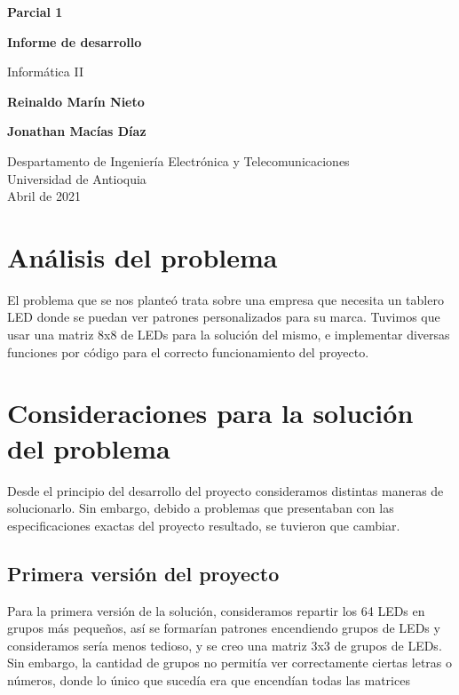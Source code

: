 \documentclass{article}
\begin{document}
\begin{titlepage}
    \begin{center}
        \vspace*{1cm}
            
        \Huge
        \textbf{Parcial 1}
        
        \textbf{Informe de desarrollo}
            
        \vspace{0.5cm}
        \LARGE
        Informática II
            
        \vspace{1.5cm}
            
        \textbf{Reinaldo Marín Nieto}


        \textbf{Jonathan Macías Díaz}
            
        \vfill
            
        \vspace{0.8cm}
            
        \Large
        Despartamento de Ingeniería Electrónica y Telecomunicaciones\\
        Universidad de Antioquia\\
        Abril de 2021
            
    \end{center}
\end{titlepage}

\tableofcontents
\newpage
\section{Análisis del problema}\label{intro}
El problema que se nos planteó trata sobre una empresa que necesita un tablero LED donde se puedan ver patrones personalizados para su marca. Tuvimos que usar una matriz 8x8 de LEDs para la solución del mismo, e implementar diversas funciones por código para el correcto funcionamiento del proyecto.



\section{Consideraciones para la solución del problema} \label{contenido}
Desde el principio del desarrollo del proyecto consideramos distintas maneras de solucionarlo. Sin embargo, debido a problemas que presentaban con las especificaciones exactas del proyecto resultado, se tuvieron que cambiar.


\subsection{Primera versión del proyecto}
Para la primera versión de la solución, consideramos repartir los 64 LEDs en grupos más pequeños, así se formarían patrones encendiendo grupos de LEDs y consideramos sería menos tedioso, y se creo una matriz 3x3 de grupos de LEDs. Sin embargo, la cantidad de grupos no permitía ver correctamente ciertas letras o números, donde lo único que sucedía era que encendían todas las matrices
\end{document}
